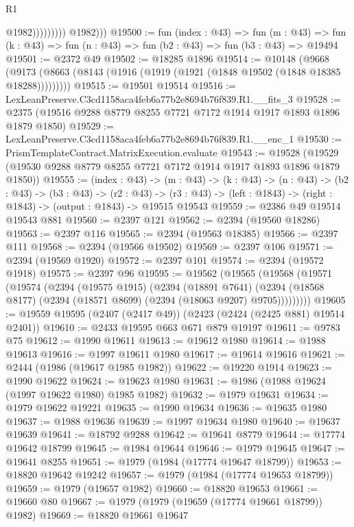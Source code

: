 \begin{lexlean}{R1}
\begin{coremodule}
                            @1982)))))))))
          @1982)))
@19500 := fun (index : @43) =>
  fun (m : @43) => fun (k : @43) => fun (n : @43) => fun (b2 : @43) => fun (b3 : @43) => @19494
@19501 := @2372 @49
@19502 := @18285 @1896
@19514 := @10148
    (@9668 (@9173 (@8663 (@8143 (@1916 (@1919 (@1921 (@1848 @19502 (@1848 @18385 @18288)))))))))
@19515 := @19501 @19514
@19516 := LexLeanPreserve.C3cd1158aca4feb6a77b2e8694b76f839.R1.__fits_3
@19528 := @2375 (@19516 @9288 @8779 @8255 @7721 @7172 @1914 @1917 @1893 @1896 @1879 @1850)
@19529 := LexLeanPreserve.C3cd1158aca4feb6a77b2e8694b76f839.R1.__enc_1
@19530 := PrismTemplateContract.MatrixExecution.evaluate
@19543 := @19528 (@19529 (@19530 @9288 @8779 @8255 @7721 @7172 @1914 @1917 @1893 @1896 @1879 @1850))
@19555 := (index : @43) ->
  (m : @43) ->
  (k : @43) ->
  (n : @43) ->
  (b2 : @43) ->
  (b3 : @43) ->
  (r2 : @43) -> (r3 : @43) -> (left : @1843) -> (right : @1843) -> (output : @1843) -> @19515 @19543
@19559 := @2386 @49 @19514 @19543 @881
@19560 := @2397 @121
@19562 := @2394 (@19560 @18286)
@19563 := @2397 @116
@19565 := @2394 (@19563 @18385)
@19566 := @2397 @111
@19568 := @2394 (@19566 @19502)
@19569 := @2397 @106
@19571 := @2394 (@19569 @1920)
@19572 := @2397 @101
@19574 := @2394 (@19572 @1918)
@19575 := @2397 @96
@19595 := @19562
    (@19565
      (@19568
        (@19571
          (@19574
            (@2394
              (@19575 @1915)
              (@2394
                (@18891 @7641)
                (@2394 (@18568 @8177) (@2394 (@18571 @8699) (@2394 (@18063 @9207) @9705)))))))))
@19605 := @19559 @19595 (@2407 (@2417 @49)) (@2423 (@2424 (@2425 @881) @19514 @2401))
@19610 := @2433 @19595 @663 @671 @879 @19197
@19611 := @9783 @75
@19612 := @1990 @19611
@19613 := @19612 @1980
@19614 := @1988 @19613
@19616 := @1997 @19611 @1980
@19617 := @19614 @19616
@19621 := @2444 (@1986 (@19617 @1985 @1982))
@19622 := @19220 @1914
@19623 := @1990 @19622
@19624 := @19623 @1980
@19631 := @1986 (@1988 @19624 (@1997 @19622 @1980) @1985 @1982)
@19632 := @1979 @19631
@19634 := @1979 @19622 @19221
@19635 := @1990 @19634
@19636 := @19635 @1980
@19637 := @1988 @19636
@19639 := @1997 @19634 @1980
@19640 := @19637 @19639
@19641 := @18792 @9288
@19642 := @19641 @8779
@19644 := @17774 @19642 @18799
@19645 := @1984 @19644
@19646 := @1979 @19645
@19647 := @19641 @8255
@19651 := @1979 (@1984 (@17774 @19647 @18799))
@19653 := @18820 @19642 @19242
@19657 := @1979 (@1984 (@17774 @19653 @18799))
@19659 := @1979 (@19657 @1982)
@19660 := @18820 @19653
@19661 := @19660 @80
@19667 := @1979 (@1979 (@19659 (@17774 @19661 @18799)) @1982)
@19669 := @18820 @19661 @19647

\end{coremodule}
\end{lexlean}
